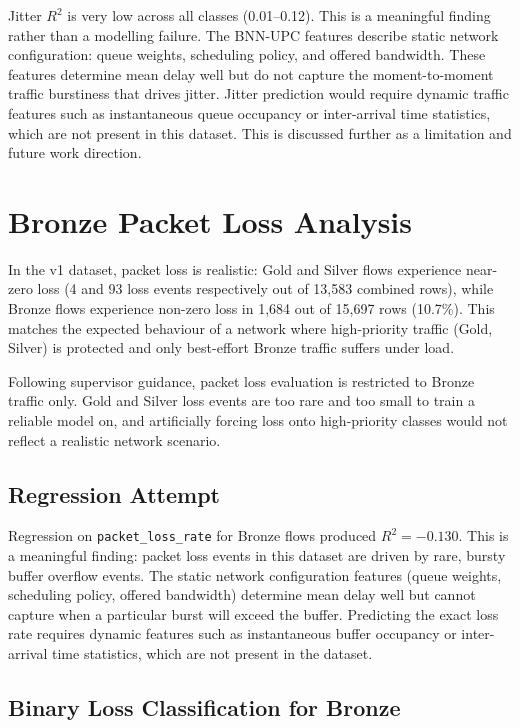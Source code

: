 \documentclass[a4paper,12pt]{Classes/RoboticsLaTeX}
\begin{document}
Jitter $R^2$ is very low across all classes (0.01--0.12). This is a meaningful finding rather than a modelling failure. The BNN-UPC features describe static network configuration: queue weights, scheduling policy, and offered bandwidth. These features determine mean delay well but do not capture the moment-to-moment traffic burstiness that drives jitter. Jitter prediction would require dynamic traffic features such as instantaneous queue occupancy or inter-arrival time statistics, which are not present in this dataset. This is discussed further as a limitation and future work direction.

\section{Bronze Packet Loss Analysis}

In the v1 dataset, packet loss is realistic: Gold and Silver flows experience near-zero loss (4 and 93 loss events respectively out of 13,583 combined rows), while Bronze flows experience non-zero loss in 1,684 out of 15,697 rows (10.7\%). This matches the expected behaviour of a network where high-priority traffic (Gold, Silver) is protected and only best-effort Bronze traffic suffers under load.

Following supervisor guidance, packet loss evaluation is restricted to Bronze traffic only. Gold and Silver loss events are too rare and too small to train a reliable model on, and artificially forcing loss onto high-priority classes would not reflect a realistic network scenario.

\subsection{Regression Attempt}

Regression on \texttt{packet\_loss\_rate} for Bronze flows produced $R^2 = -0.130$. This is a meaningful finding: packet loss events in this dataset are driven by rare, bursty buffer overflow events. The static network configuration features (queue weights, scheduling policy, offered bandwidth) determine mean delay well but cannot capture when a particular burst will exceed the buffer. Predicting the exact loss rate requires dynamic features such as instantaneous buffer occupancy or inter-arrival time statistics, which are not present in the dataset.

\subsection{Binary Loss Classification for Bronze}
\end{document}
